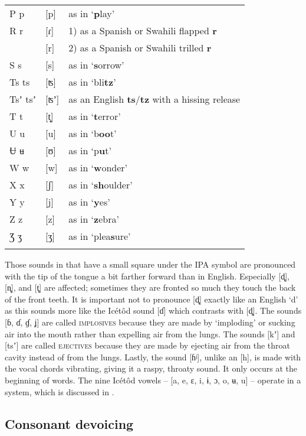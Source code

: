 \begin{table}
\begin{tabularx}{\textwidth}{llX}
P p & [p] & as in ‘\textbf{p}lay’\\
R r & [ɾ] & 1) as a Spanish or Swahili flapped \textbf{r}\\
& [r] & 2) as a Spanish or Swahili trilled \textbf{r}\\
S s & [s] & as in ‘\textbf{s}orrow’\\
Ts ts & [ʦ] & as in ‘bli\textbf{tz}’\\
Tsʼ tsʼ & [ʦʼ] & as an English \textbf{ts}/\textbf{tz} with a hissing release\\
T t & [t̻] & as in ‘\textbf{t}error’\\
U u & [u] & as in ‘b\textbf{oo}t’\\
Ʉ ʉ & [ʊ] & as in ‘p\textbf{u}t’\\
W w & [w] & as in ‘\textbf{w}onder’\\
X x & [ʃ] & as in ‘\textbf{sh}oulder’\\
Y y & [j] & as in ‘\textbf{y}es’\\
Z z & [z] & as in ‘\textbf{z}ebra’\\
Ʒ ʒ & [ʒ] & as in ‘plea\textbf{s}ure’\\
\lspbottomrule
\end{tabularx}

\end{table}

Those sounds in  that have a small square under the IPA symbol are pronounced with the tip of the tongue a bit farther forward than in English. Especially [d̻], [n̻], and [t̻] are affected; sometimes they are fronted so much they touch the back of the front teeth. It is important not to pronounce [d̻] exactly like an English ‘d’ as this sounds more like the Icétôd sound [ɗ] which contrasts with [d̻]. The sounds [ɓ, ɗ, ɠ, ʝ] are called \textsc{implosives} because they are made by ‘imploding’ or sucking air into the mouth rather than expelling air from the lungs. The sounds [kʼ] and [tsʼ] are called \textsc{ejectives} because they are made by ejecting air from the throat cavity instead of from the lungs. Lastly, the sound [ɦʲ], unlike an [h], is made with the vocal chords vibrating, giving it a raspy, throaty sound. It only occurs at the beginning of words. The nine Icétôd vowels – [a, e, ɛ, i, ɨ, ɔ, o, ʉ, u] – operate in a  system, which is discussed in .
 
\subsection{Consonant devoicing}\label{sec:2.2}


